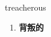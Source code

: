 
\begin{frame}
{\huge treacherous}
\begin{center}
\begin{enumerate}\Large
  \item \textbf{背叛的}
\end{enumerate}
\end{center}
\end{frame}
